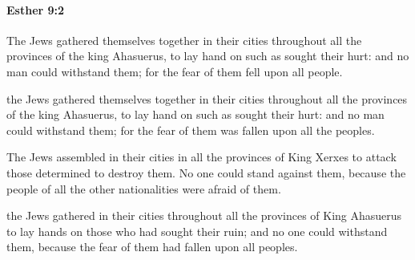 		\paragraph{Esther 9:2} %
			\label{ESTHER-9-2}

			The Jews gathered themselves together in their cities throughout all the provinces of the king Ahasuerus, to lay hand on such as sought their hurt: and no man could withstand them; for the fear of them fell upon all people.

			\begin{versebox}
					\item[BHS] 
					\item[LXX] 
					\item[ASV] the Jews gathered themselves together in their cities throughout all the provinces of the king Ahasuerus, to lay hand on such as sought their hurt: and no man could withstand them; for the fear of them was fallen upon all the peoples.
					\item[NIV] The Jews assembled in their cities in all the provinces of King Xerxes to attack those determined to destroy them. No one could stand against them, because the people of all the other nationalities were afraid of them.
					\item[NRSV] the Jews gathered in their cities throughout all the provinces of King Ahasuerus to lay hands on those who had sought their ruin; and no one could withstand them, because the fear of them had fallen upon all peoples.
			\end{versebox}

